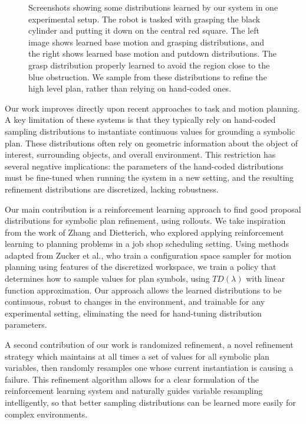 \begin{figure}[h]
  \caption{Screenshots showing some distributions learned by our system in one experimental
    setup. The robot is tasked with grasping the black cylinder and putting it down on the
    central red square. The left image shows learned base motion and grasping distributions,
    and the right shows learned base motion and putdown distributions. The grasp distribution
    properly learned to avoid the region close to the blue obstruction. We sample from these distributions
    to refine the high level plan, rather than relying on hand-coded ones.}
  \label{fig:cover}
\end{figure}

Our work improves directly upon recent approaches to task and motion planning.
A key limitation of these systems is that they typically rely on hand-coded
sampling distributions to instantiate continuous values for grounding a symbolic plan.
These distributions often rely on
geometric information about the object of interest, surrounding objects, and overall
environment. This restriction has several negative implications: the parameters of the
hand-coded distributions must be fine-tuned when running the system in a new setting, and the
resulting refinement distributions are discretized, lacking robustness.

Our main contribution is a reinforcement learning approach to find good proposal
distributions for symbolic plan refinement, using rollouts. We take inspiration
from the work of Zhang and Dietterich, who explored applying reinforcement learning
to planning problems in a job shop scheduling setting. Using methods adapted from
Zucker et al., who train a configuration space sampler for motion planning
using features of the discretized workspace, we train a policy that
determines how to sample values for plan symbols, using $TD(\lambda)$ with linear function
approximation. Our approach allows
the learned distributions to be continuous, robust to changes in the environment, and
trainable for any experimental setting, eliminating the need for hand-tuning distribution parameters.

A second contribution of our work is randomized refinement, a novel refinement strategy
which maintains at all times a set of values for all symbolic plan variables, then randomly
resamples one whose current instantiation is causing a failure.
This refinement algorithm allows for a clear formulation of the reinforcement
learning system and naturally guides variable resampling intelligently, so that better
sampling distributions can be learned more easily for complex environments.

